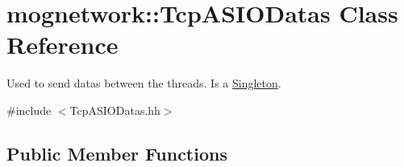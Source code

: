\hypertarget{classmognetwork_1_1_tcp_a_s_i_o_datas}{\section{mognetwork\-:\-:Tcp\-A\-S\-I\-O\-Datas Class Reference}
\label{classmognetwork_1_1_tcp_a_s_i_o_datas}
}


Used to send datas between the threads. Is a \hyperlink{classmognetwork_1_1_singleton}{Singleton}.  




{\ttfamily \#include $<$Tcp\-A\-S\-I\-O\-Datas.\-hh$>$}

\subsection*{Public Member Functions}
